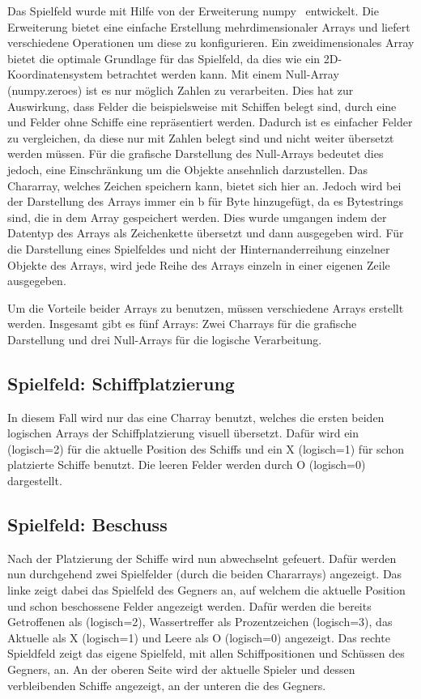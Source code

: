 \documentclass{llncs}
\begin{document}
Das Spielfeld wurde mit Hilfe von der Erweiterung numpy~\cite{Numpy} entwickelt. Die Erweiterung bietet eine einfache Erstellung mehrdimensionaler Arrays und liefert verschiedene Operationen um diese zu konfigurieren.
Ein zweidimensionales Array bietet die optimale Grundlage für das Spielfeld, da dies wie ein 2D-Koordinatensystem betrachtet werden kann.
Mit einem Null-Array (numpy.zeroes) ist es nur möglich Zahlen zu verarbeiten. Dies hat zur Auswirkung, dass Felder die beispielsweise mit Schiffen belegt sind, durch eine \grqq{} und Felder ohne Schiffe eine \grqq{} repräsentiert werden.
Dadurch ist es einfacher Felder zu vergleichen, da diese nur mit Zahlen belegt sind und nicht weiter übersetzt werden müssen. Für die grafische Darstellung des Null-Arrays bedeutet dies jedoch, eine Einschränkung um die
Objekte ansehnlich darzustellen. 
Das Chararray, welches Zeichen speichern kann, bietet sich hier an. Jedoch wird bei der Darstellung des Arrays immer ein \glqq b\grqq{} für Byte hinzugefügt, da es Bytestrings sind, die in dem Array gespeichert werden. 
Dies wurde umgangen indem der Datentyp des Arrays als Zeichenkette übersetzt und dann ausgegeben wird. Für die Darstellung eines Spielfeldes und nicht der Hinternanderreihung einzelner Objekte des Arrays, wird jede Reihe des 
Arrays einzeln in einer eigenen Zeile ausgegeben.

Um die Vorteile beider Arrays zu benutzen, müssen verschiedene Arrays erstellt werden. Insgesamt gibt es fünf Arrays: Zwei Charrays für die grafische Darstellung und drei Null-Arrays für die logische Verarbeitung.

\subsection{Spielfeld: Schiffplatzierung}

In diesem Fall wird nur das eine Charray benutzt, welches die ersten beiden logischen Arrays der Schiffplatzierung visuell übersetzt. Dafür wird ein \glqq *\grqq{} (logisch=2) für die aktuelle Position des Schiffs und ein \glqq X\grqq{} (logisch=1)
für schon platzierte Schiffe benutzt. Die leeren Felder werden durch \glqq O\grqq{} (logisch=0) dargestellt.

\subsection{Spielfeld: Beschuss}

Nach der Platzierung der Schiffe wird nun abwechselnt gefeuert. Dafür werden nun durchgehend zwei Spielfelder (durch die beiden Chararrays) angezeigt. Das linke zeigt dabei das Spielfeld des Gegners an, auf welchem die aktuelle Position und
schon beschossene Felder angezeigt werden. Dafür werden die bereits Getroffenen als \glqq *\grqq{} (logisch=2), Wassertreffer als \glqq Prozentzeichen\grqq{} (logisch=3), das Aktuelle als \glqq X\grqq{} (logisch=1) und Leere als \glqq O\grqq{} (logisch=0)
angezeigt. Das rechte Spieldfeld zeigt das eigene Spielfeld, mit allen Schiffpositionen und Schüssen des Gegners, an. An der oberen Seite wird der aktuelle Spieler und dessen verbleibenden Schiffe angezeigt, an
der unteren die des Gegners. 
\end{document}

